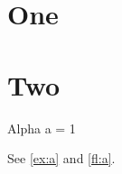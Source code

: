 \documentclass{article}
\begin{document}
\section{One}
\section{Two}
\begin{ex}[label=ex:a]{Alpha}
a = 1
\end{ex}
See \ref{ex:a} and \ref{fl:a}.
\end{document}
